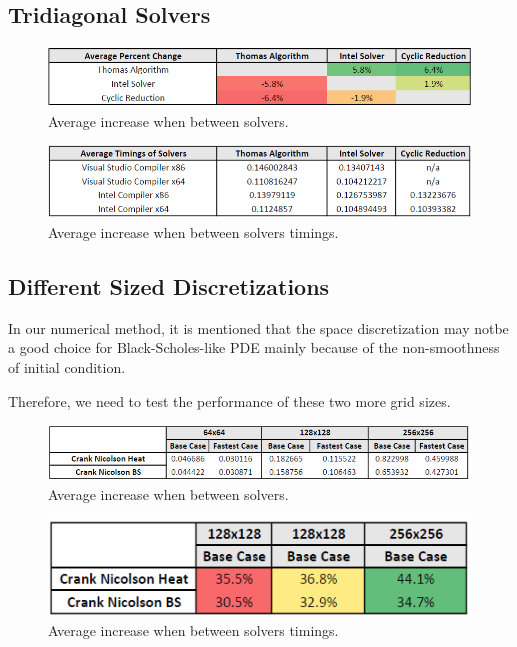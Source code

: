 \documentclass[12pt, oneside]{book}
\theoremstyle{plain}
\theoremstyle{definition}
\begin{document}
\subsection{Tridiagonal Solvers} 
 \begin{figure}[!htb]
    \centering
        \includegraphics[scale=0.7]{solverAveragePercentage.png}
    \caption{Average increase when between solvers.}
\end{figure}
\begin{figure}[!htb]
    \centering
        \includegraphics[scale=0.6]{solverAverage.png}
    \caption{Average increase when between solvers timings.}
\end{figure}
\subsection{Different Sized Discretizations} 

In our numerical method, it is mentioned that the  space discretization may notbe a good choice for Black-Scholes-like PDE mainly because of the non-smoothness of initial condition.  

Therefore, we need to test the performance of these two more grid sizes.  
    
 \begin{figure}[!htb]
    \centering
        \includegraphics[scale=0.7]{gridTime.png}
    \caption{Average increase when between solvers.}
\end{figure}

\begin{figure}[!htb]
    \centering
        \includegraphics[scale=0.6]{gridTimePercent.png}
    \caption{Average increase when between solvers timings.}
\end{figure}
\end{document}
